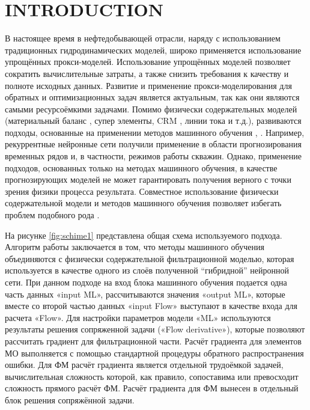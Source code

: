 \documentclass{article}
\begin{document}
\maketitle

\section{INTRODUCTION}

В настоящее время в нефтедобывающей отрасли, наряду с использованием традиционных гидродинамических моделей, широко применяется использование упрощённых прокси-моделей. Использование упрощённых моделей позволяет сократить вычислительные затраты, а также снизить требования к качеству и полноте исходных данных. Развитие и применение прокси-моделирования для обратных и оптимизационных задач является актуальным, так как они являются самыми ресурсоёмкими задачами. Помимо физически содержательных моделей (материальный баланс \cite{mus1}, супер элементы, CRM \cite{bek}, линии тока \cite{pot} и т.д.), развиваются подходы, основанные на применении методов машинного обучения \cite{tem}, \cite{uma}. Например, рекуррентные нейронные сети получили применение в области прогнозирования временных рядов и, в частности, режимов работы скважин. Однако, применение подходов, основанных только на методах машинного обучения, в качестве прогнозирующих моделей не может гарантировать получения верного с точки зрения физики процесса результата. Совместное использование физически содержательной модели и методов машинного обучения позволяет избегать проблем подобного рода \cite{kos2}.

На рисунке \ref{fig:schime1} представлена общая схема используемого подхода. Алгоритм работы заключается в том, что методы машинного обучения объединяются с физически содержательной фильтрационной моделью, которая используется в качестве одного из слоёв полученной “гибридной” нейронной сети. При данном подходе на вход блока машинного обучения подается одна часть данных «input ML», рассчитываются значения «output ML», которые вместе со второй частью данных «input Flow» выступают в качестве входа для расчета «Flow». Для настройки параметров модели «ML» используются результаты решения сопряженной задачи («Flow derivative»), которые позволяют рассчитать градиент для фильтрационной части. Расчёт градиента для элементов МО выполняется с помощью стандартной процедуры обратного распространения ошибки. Для ФМ расчёт градиента является отдельной трудоёмкой задачей, вычислительная сложность которой, как правило, сопоставима или превосходит сложность прямого расчёт ФМ. Расчёт градиента для ФМ вынесен в отдельный блок решения сопряжённой задачи.
\end{document}

